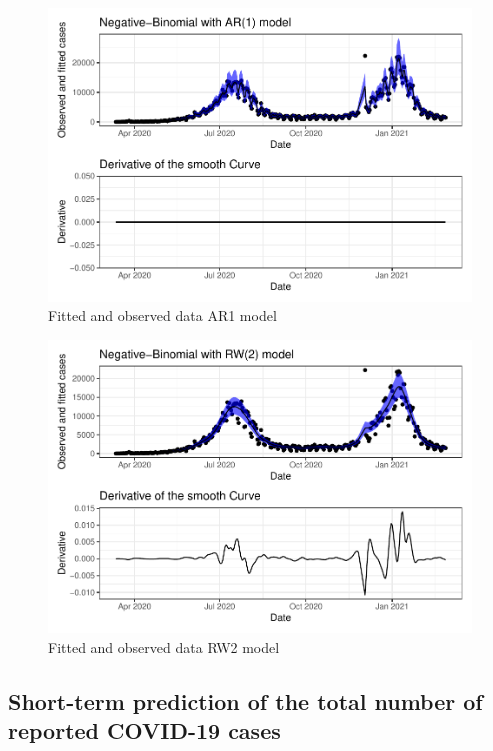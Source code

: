\documentclass[10pt,letterpaper]{article}
\begin{document}
\begin{figure}[H]
\includegraphics[width=0.99\linewidth]{COVIDincidenceSA_files/figure-latex/unnamed-chunk-5-1} \caption{Fitted and observed data AR1 model}\label{fig:unnamed-chunk-5}
\end{figure}

\begin{figure}[H]
\includegraphics[width=0.99\linewidth]{COVIDincidenceSA_files/figure-latex/unnamed-chunk-6-1} \caption{Fitted and observed data RW2 model}\label{fig:unnamed-chunk-6}
\end{figure}

\hypertarget{short-term-prediction-of-the-total-number-of-reported-covid-19-cases}{%
\subsection{Short-term prediction of the total number of reported
COVID-19
cases}\label{short-term-prediction-of-the-total-number-of-reported-covid-19-cases}}
\end{document}
